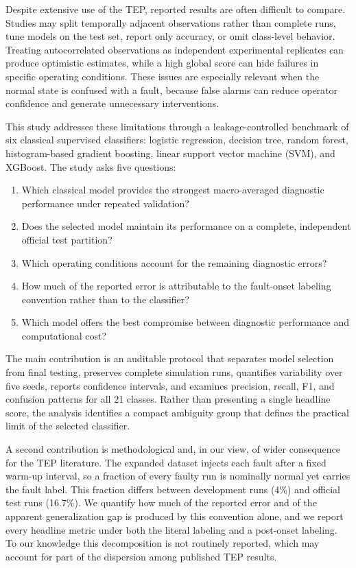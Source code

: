 \documentclass[10pt,twocolumn,a4paper]{article}
\begin{document}
Despite extensive use of the TEP, reported results are often difficult to
compare. Studies may split temporally adjacent observations rather than complete
runs, tune models on the test set, report only accuracy, or omit class-level
behavior. Treating autocorrelated observations as independent experimental
replicates can produce optimistic estimates, while a high global score can hide
failures in specific operating conditions. These issues are especially relevant
when the normal state is confused with a fault, because false alarms can reduce
operator confidence and generate unnecessary interventions.

This study addresses these limitations through a leakage-controlled benchmark
of six classical supervised classifiers: logistic regression, decision tree,
random forest, histogram-based gradient boosting, linear support vector machine
(SVM), and XGBoost. The study asks five questions:

\begin{enumerate}
  \item Which classical model provides the strongest macro-averaged diagnostic
  performance under repeated validation?
  \item Does the selected model maintain its performance on a complete,
  independent official test partition?
  \item Which operating conditions account for the remaining diagnostic errors?
  \item How much of the reported error is attributable to the fault-onset
  labeling convention rather than to the classifier?
  \item Which model offers the best compromise between diagnostic performance
  and computational cost?
\end{enumerate}

The main contribution is an auditable protocol that separates model selection
from final testing, preserves complete simulation runs, quantifies variability
over five seeds, reports confidence intervals, and examines precision, recall,
F1, and confusion patterns for all 21 classes. Rather than presenting a single
headline score, the analysis identifies a compact ambiguity group that defines
the practical limit of the selected classifier.

A second contribution is methodological and, in our view, of wider consequence
for the TEP literature. The expanded dataset injects each fault after a fixed
warm-up interval, so a fraction of every faulty run is nominally normal yet
carries the fault label. This fraction differs between development runs (4\%)
and official test runs (16.7\%). We quantify how much of the reported error and
of the apparent generalization gap is produced by this convention alone, and we
report every headline metric under both the literal labeling and a post-onset
labeling. To our knowledge this decomposition is not routinely reported, which
may account for part of the dispersion among published TEP results.
\end{document}
